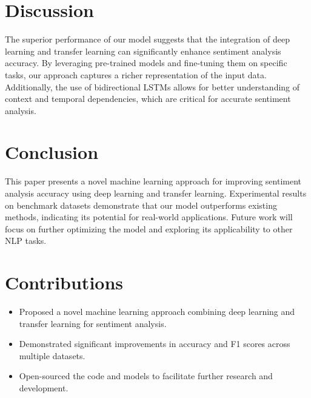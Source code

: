 \documentclass{article}
\begin{document}
\section{Discussion}
The superior performance of our model suggests that the integration of deep learning and transfer learning can significantly enhance sentiment analysis accuracy. By leveraging pre-trained models and fine-tuning them on specific tasks, our approach captures a richer representation of the input data. Additionally, the use of bidirectional LSTMs allows for better understanding of context and temporal dependencies, which are critical for accurate sentiment analysis.

\section{Conclusion}
This paper presents a novel machine learning approach for improving sentiment analysis accuracy using deep learning and transfer learning. Experimental results on benchmark datasets demonstrate that our model outperforms existing methods, indicating its potential for real-world applications. Future work will focus on further optimizing the model and exploring its applicability to other NLP tasks.

\section{Contributions}
\begin{itemize}
    \item Proposed a novel machine learning approach combining deep learning and transfer learning for sentiment analysis.
    \item Demonstrated significant improvements in accuracy and F1 scores across multiple datasets.
    \item Open-sourced the code and models to facilitate further research and development.
\end{itemize}



\end{document}
